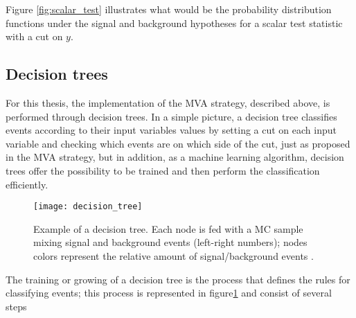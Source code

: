 Figure \ref{fig:scalar_test} illustrates what would be the probability distribution functions under the signal and background hypotheses for a scalar test statistic with a cut on $y$.


\subsection{Decision trees }

For this thesis, the implementation of the MVA strategy, described above, is performed through decision trees. In a simple picture, a decision tree classifies events according to their input variables values by setting a cut on each input variable and checking which events are on which side of the cut, just as proposed in the MVA strategy, but in addition, as a machine learning algorithm, decision trees offer the possibility to be trained and then perform the classification efficiently.    

\begin{figure}[!h]
  \centering
  \texttt{[image: decision\_tree]}
  \caption[Decision tree.]{Example of a decision tree. Each node is fed with a MC sample mixing signal and background events (left-right numbers); nodes colors represent the relative amount of signal/background events \cite{luca}.}\label{fig:dt}
\end{figure}

The training or growing of a decision tree is the process that defines the rules for classifying events; this process is represented in figure\ref{fig:dt} and consist of several steps

